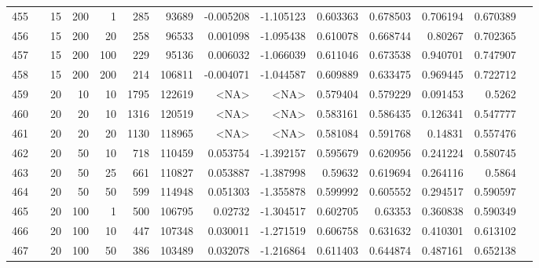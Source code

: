 \begin{longtable}{llrrrrrrrrrrrr}
		455 & &           15 &               200 &            1 &          285 &      93689 & -0.005208 & -1.105123 &  0.603363 &    0.678503 &       0.706194 &  0.670389 \\
		456 & &           15 &               200 &           20 &          258 &      96533 &  0.001098 & -1.095438 &  0.610078 &    0.668744 &        0.80267 &  0.702365 \\
		457 & &           15 &               200 &          100 &          229 &      95136 &  0.006032 & -1.066039 &  0.611046 &    0.673538 &       0.940701 &  0.747907 \\
		458 & &           15 &               200 &          200 &          214 &     106811 & -0.004071 & -1.044587 &  0.609889 &    0.633475 &       0.969445 &  0.722712 \\
		459 & &           20 &                10 &           10 &           1795 &     122619 &      <NA> &      <NA> &  0.579404 &    0.579229 &       0.091453 &    0.5262 \\
		460 & &           20 &                20 &           10 &           1316 &     120519 &      <NA> &      <NA> &  0.583161 &    0.586435 &       0.126341 &  0.547777 \\
		461 & &           20 &                20 &           20 &           1130 &     118965 &      <NA> &      <NA> &  0.581084 &    0.591768 &        0.14831 &  0.557476 \\
		462 & &           20 &                50 &           10 &          718 &     110459 &  0.053754 & -1.392157 &  0.595679 &    0.620956 &       0.241224 &  0.580745 \\
		463 & &           20 &                50 &           25 &          661 &     110827 &  0.053887 & -1.387998 &   0.59632 &    0.619694 &       0.264116 &    0.5864 \\
		464 & &           20 &                50 &           50 &          599 &     114948 &  0.051303 & -1.355878 &  0.599992 &    0.605552 &       0.294517 &  0.590597 \\
		465 & &           20 &               100 &            1 &          500 &     106795 &   0.02732 & -1.304517 &  0.602705 &     0.63353 &       0.360838 &  0.590349 \\
		466 & &           20 &               100 &           10 &          447 &     107348 &  0.030011 & -1.271519 &  0.606758 &    0.631632 &       0.410301 &  0.613102 \\
		467 & &           20 &               100 &           50 &          386 &     103489 &  0.032078 & -1.216864 &  0.611403 &    0.644874 &       0.487161 &  0.652138 \\

\end{longtable}
